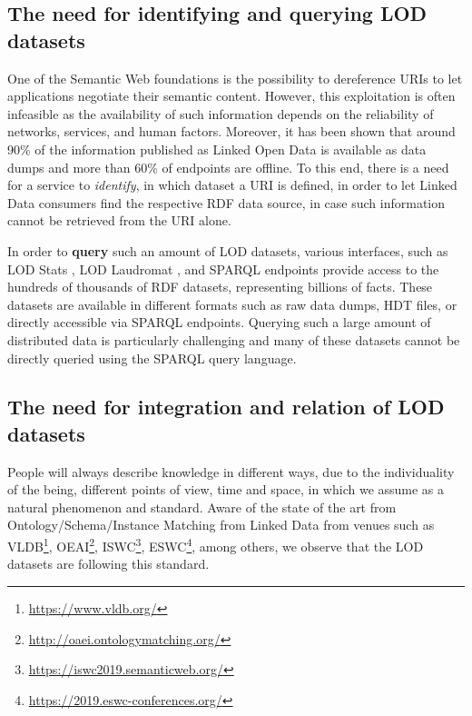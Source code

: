 \documentclass[sw]{iosart2x}
\begin{document}

\subsection{The need for identifying and querying LOD datasets}
One of the Semantic Web foundations is the possibility to dereference URIs to let applications negotiate their semantic content.
However, this exploitation is often infeasible as the availability of such information depends on the reliability of networks, services, and human factors.
Moreover, it has been shown that around 90\% of the information published as Linked Open Data is available as data dumps and more than 60\% of endpoints are offline\cite{hogan2016linked}.
To this end, there is a need for a service to \textit{identify}, in which dataset a URI is defined, in order to let Linked Data consumers find the respective RDF data source, in case such information cannot be retrieved from the URI alone.

In order to \textbf{query} such an amount of LOD datasets, various interfaces, such as LOD Stats \cite{auer2012lodstats}, LOD Laudromat \cite{beek2014lod}, and SPARQL endpoints provide access to the hundreds of thousands of RDF datasets, representing billions of facts.
These datasets are available in different formats such as raw data dumps, HDT files, or directly accessible via SPARQL endpoints.
Querying such a large amount of distributed data is particularly challenging and many of these datasets cannot be directly queried using the SPARQL query language. %

\subsection{The need for integration and relation of LOD datasets}

People will always describe knowledge in different ways, due to the individuality of the being, different points of view, time and space, in which we assume as a natural phenomenon and standard.
Aware of the state of the art from Ontology/Schema/Instance Matching from Linked Data from venues such as VLDB\footnote{\url{https://www.vldb.org/}}, OEAI\footnote{\url{http://oaei.ontologymatching.org/}}, ISWC\footnote{\url{https://iswc2019.semanticweb.org/}}, ESWC\footnote{\url{https://2019.eswc-conferences.org/}}, among others, we observe that the LOD datasets are following this standard.
\end{document}
